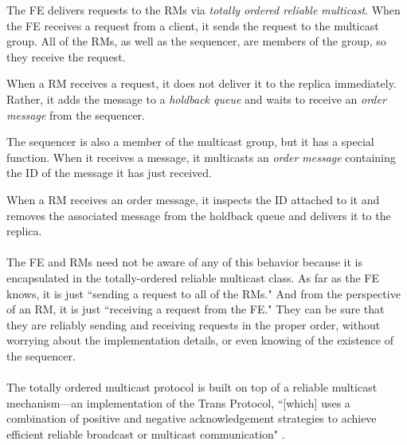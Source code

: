 \documentclass{article}
\begin{document}
The FE delivers requests to the RMs via \emph{totally ordered reliable multicast}.
When the FE receives a request from a client, it sends the request to the multicast group.
All of the RMs, as well as the sequencer, are members of the group, so they receive the request.

When a RM receives a request, it does not deliver it to the replica immediately.
Rather, it adds the message to a \emph{holdback queue} and waits to receive an \emph{order message} from the sequencer.

The sequencer is also a member of the multicast group, but it has a special function.
When it receives a message, it multicasts an \emph{order message} containing the ID of the message it has just received.

When a RM receives an order message, it inspects the ID attached to it and removes the associated message from the holdback queue and delivers it to the replica.

\paragraph{}

The FE and RMs need not be aware of any of this behavior because it is encapsulated in the totally-ordered reliable multicast class.
As far as the FE knows, it is just ``sending a request to all of the RMs."
And from the perspective of an RM, it is just ``receiving a request from the FE."
They can be sure that they are reliably sending and receiving requests in the proper order, without worrying about the implementation details, or even knowing of the existence of the sequencer.

\paragraph{}

The totally ordered multicast protocol is built on top of a reliable multicast mechanism---an implementation of the Trans Protocol, ``[which] uses a combination of positive and negative acknowledgement strategies to achieve efficient reliable broadcast or multicast communication" \cite{melliar-smith-trans}.

\paragraph{}
\end{document}
